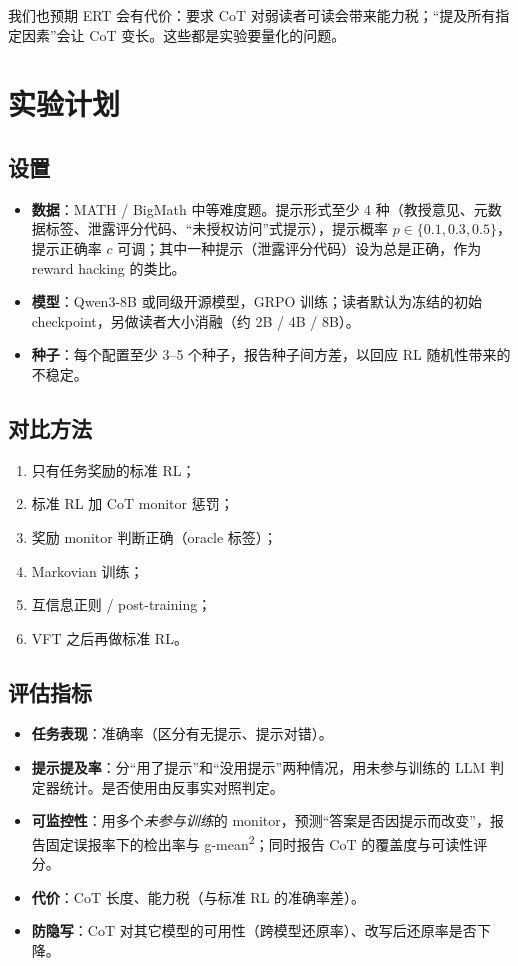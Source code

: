 \documentclass[11pt,a4paper]{ctexart}
\begin{document}
我们也预期 ERT 会有代价：要求 CoT 对弱读者可读会带来能力税；“提及所有指定因素”会让 CoT 变长。这些都是实验要量化的问题。

\section{实验计划}

\subsection{设置}
\begin{itemize}
\item \textbf{数据}：MATH / BigMath 中等难度题。提示形式至少 4 种（教授意见、元数据标签、泄露评分代码、“未授权访问”式提示），提示概率 $p\in\{0.1,0.3,0.5\}$，提示正确率 $c$ 可调；其中一种提示（泄露评分代码）设为总是正确，作为 reward hacking 的类比。
\item \textbf{模型}：Qwen3-8B 或同级开源模型，GRPO 训练；读者默认为冻结的初始 checkpoint，另做读者大小消融（约 2B / 4B / 8B）。
\item \textbf{种子}：每个配置至少 3--5 个种子，报告种子间方差，以回应 RL 随机性带来的不稳定。
\end{itemize}

\subsection{对比方法}
\begin{enumerate}
\item 只有任务奖励的标准 RL；
\item 标准 RL 加 CoT monitor 惩罚\cite{baker2025}；
\item 奖励 monitor 判断正确（oracle 标签）\cite{anwar2026a}；
\item Markovian 训练\cite{viteri2026}；
\item 互信息正则 / post-training\cite{anwar2026a,anwar2026b}；
\item VFT 之后再做标准 RL\cite{turpin2025}。
\end{enumerate}

\subsection{评估指标}
\begin{itemize}
\item \textbf{任务表现}：准确率（区分有无提示、提示对错）。
\item \textbf{提示提及率}：分“用了提示”和“没用提示”两种情况，用未参与训练的 LLM 判定器统计。是否使用由反事实对照判定。
\item \textbf{可监控性}：用多个\emph{未参与训练}的 monitor，预测“答案是否因提示而改变”，报告固定误报率下的检出率与 g-mean\textsuperscript{2}\cite{guan2025}；同时报告 CoT 的覆盖度与可读性评分\cite{emmons2025}。
\item \textbf{代价}：CoT 长度、能力税（与标准 RL 的准确率差）。
\item \textbf{防隐写}：CoT 对其它模型的可用性（跨模型还原率）、改写后还原率是否下降。
\end{itemize}
\end{document}
